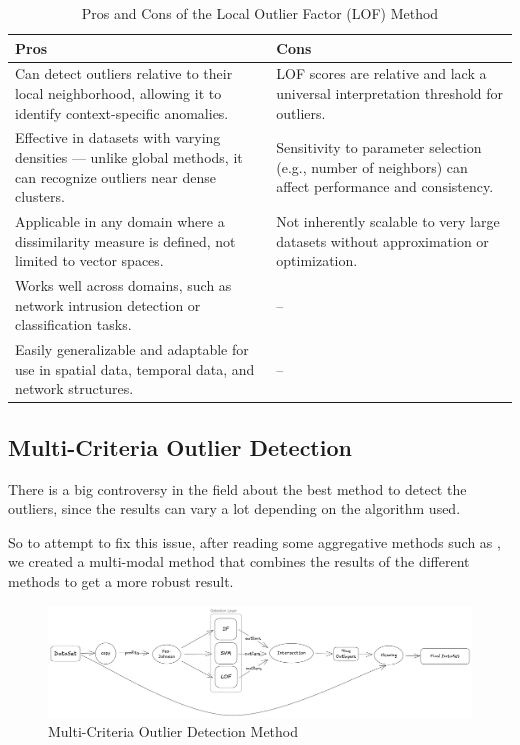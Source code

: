 \documentclass[11pt,english,a4paper,hidelinks]{book}
\begin{document}
\begin{table}[H]
    \centering
    \begin{tabular}{|p{7cm}|p{7cm}|}
    \hline
    \textbf{Pros} & \textbf{Cons} \\
    \hline
    Can detect outliers relative to their local neighborhood, allowing it to identify context-specific anomalies. & LOF scores are relative and lack a universal interpretation threshold for outliers. \\
    \hline
    Effective in datasets with varying densities — unlike global methods, it can recognize outliers near dense clusters. & Sensitivity to parameter selection (e.g., number of neighbors) can affect performance and consistency. \\
    \hline
    Applicable in any domain where a dissimilarity measure is defined, not limited to vector spaces. & Not inherently scalable to very large datasets without approximation or optimization. \\
    \hline
    Works well across domains, such as network intrusion detection or classification tasks. & -- \\

    \hline
    Easily generalizable and adaptable for use in spatial data, temporal data, and network structures. & -- \\
    \hline
    \end{tabular}
    \caption{Pros and Cons of the Local Outlier Factor (LOF) Method}
\end{table}
    
\subsection{Multi-Criteria Outlier Detection}

There is a big controversy in the field about the best method to detect the outliers, since the results can vary a lot depending on the algorithm used.

\vspace{0.5cm}
\noindent So to attempt to fix this issue, after reading some aggregative methods such as \textcite{abro2020stacking}, we created a multi-modal method that combines the results of the different methods to get a more robust result.

\begin{figure}[H]
    \centering
    \includegraphics[width=1\textwidth]{images/code/outliers/multimodal.png}
    \caption{Multi-Criteria Outlier Detection Method}
    \label{fig:multimodal}
\end{figure}
\end{document}
